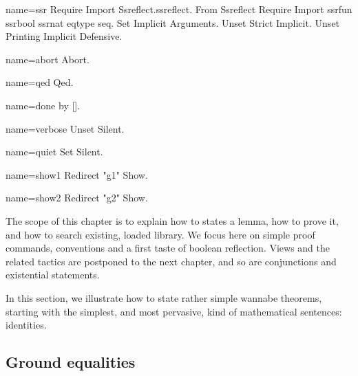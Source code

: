 \begin{coqdef}{name=ssr}
Require Import Ssreflect.ssreflect.
From Ssreflect Require Import ssrfun ssrbool ssrnat eqtype seq.
Set Implicit Arguments.
Unset Strict Implicit.
Unset Printing Implicit Defensive.
\end{coqdef}
\begin{coqdef}{name=abort}
Abort.
\end{coqdef}
\begin{coqdef}{name=qed}
Qed.
\end{coqdef}
\begin{coqdef}{name=done}
by [].
\end{coqdef}
\begin{coqdef}{name=verbose}
Unset Silent.
\end{coqdef}
\begin{coqdef}{name=quiet}
Set Silent.
\end{coqdef}
\begin{coqdef}{name=show1}
Redirect "g1" Show.
\end{coqdef}
\begin{coqdef}{name=show2}
Redirect "g2" Show.
\end{coqdef}

\label{ch:proofs}
The scope of this chapter is to explain how to states a lemma,
how to prove it, and how to search existing, loaded library.
We focus here on simple proof commands, conventions and a first taste
of boolean reflection. Views and the related tactics are postponed to the
next chapter, and so are conjunctions and existential statements.





In this section, we illustrate how to state rather simple wannabe
theorems, starting with the simplest, and most pervasive, kind of
mathematical sentences: identities.

\subsection{Ground equalities}\label{ssec:groundeq}

